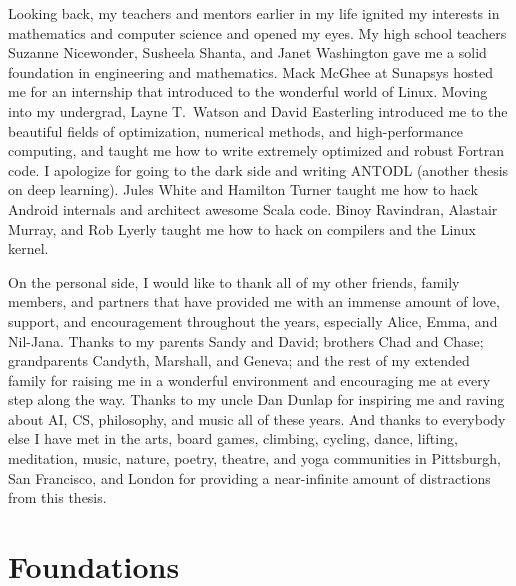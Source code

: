 \documentclass[12pt]{cmuthesis}
\begin{document}
\begin{acknowledgments}
  Looking back, my teachers and mentors earlier in my life
  ignited my interests in mathematics and computer science
  and opened my eyes.
  My high school teachers
  Suzanne Nicewonder,
  Susheela Shanta, and
  Janet Washington gave me a solid foundation
  in engineering and mathematics.
  Mack McGhee at Sunapsys hosted me for an
  internship that introduced to the wonderful
  world of Linux.
  Moving into my undergrad,
  Layne T.~Watson and David Easterling
  introduced me to the beautiful fields
  of optimization, numerical methods, and
  high-performance computing, and taught me how to
  write extremely optimized and robust Fortran code.
  I apologize for going to the dark side and writing
  ANTODL (another thesis on deep learning).
  Jules White and Hamilton Turner taught me how
  to hack Android internals and architect awesome Scala code.
  Binoy Ravindran, Alastair Murray, and Rob Lyerly
  taught me how to hack on compilers
  and the Linux kernel.

  On the personal side, I would like to thank all of my
  other friends, family members, and partners that
  have provided me with an immense amount of love,
  support, and encouragement throughout the years,
  especially Alice, Emma, and Nil-Jana.
  Thanks to my parents Sandy and David;
  brothers Chad and Chase;
  grandparents Candyth, Marshall, and Geneva;
  and the rest of my extended family
  for raising me in a wonderful environment and
  encouraging me at every step along the way.
  Thanks to my uncle Dan Dunlap for inspiring me and
  raving about AI, CS, philosophy, and music all of these years.
  And thanks to everybody else I have met in the
  arts,
  board games,
  climbing,
  cycling,
  dance,
  lifting,
  meditation,
  music,
  nature,
  poetry,
  theatre, and
  yoga
  communities in Pittsburgh, San Francisco, and London for
  providing a near-infinite amount of distractions from
  this thesis.
\end{acknowledgments}

\pagestyle{plain}

\tableofcontents
{}
\listoffigures
{}
\listoftables
\listofalgorithms

\mainmatter




\part{Foundations}


\end{document}
